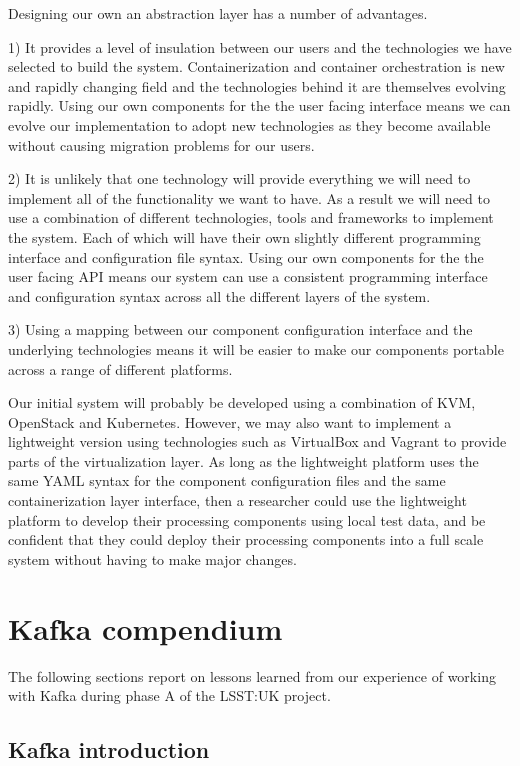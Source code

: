 \documentclass{article}
\newcommand{\yaml} {YAML\xspace}
\newcommand{\openstack} {OpenStack\xspace}
\newcommand{\kafka} {Kafka\xspace}
\newcommand{\kubernetes} {Kubernetes\xspace}
\newcommand{\virtualbox} {VirtualBox\xspace}
\newcommand{\vagrant} {Vagrant\xspace}
\newcommand{\kvm} {KVM\xspace}
\newcommand{\phasea} {phase A\xspace}
\newcommand{\lsstuk} {LSST:UK\xspace}
\begin{document}
Designing our own an abstraction layer has a number of advantages.

1) It provides a level of insulation between our users and the technologies we have selected to build the system. Containerization and container orchestration is new and rapidly changing field and the technologies behind it are themselves evolving rapidly.
Using our own components for the the user facing interface means we can evolve our implementation to adopt new technologies as they become available without causing migration problems for our users.

2) It is unlikely that one technology will provide everything we will need to implement all of the functionality we want to have. As a result we will need to use a combination of different technologies, tools and frameworks to implement the system. Each of which will have their own slightly different programming interface and configuration file syntax.
Using our own components for the the user facing API means our system can use a consistent programming interface and configuration syntax across all the different layers of the system.

3) Using a mapping between our component configuration interface and the underlying technologies means it will be easier to make our components portable across a range of different platforms.

Our initial system will probably be developed using a combination of \kvm, \openstack and \kubernetes. However, we may also want to implement a lightweight version using technologies such as \virtualbox and \vagrant to provide parts of the virtualization layer.
As long as the lightweight platform uses the same \yaml syntax for the component configuration files and the same containerization layer interface, then a researcher could use the lightweight platform to develop their processing components using local test data, and be confident that they could deploy their processing components into a full scale system without having to make major changes.

\section{Kafka compendium}
\label{kafka-compendium}

The following sections report on lessons learned from our experience of working with \kafka during \phasea of the \lsstuk project.

\subsection{Kafka introduction}
\label{kafka-introduction}
\end{document}
